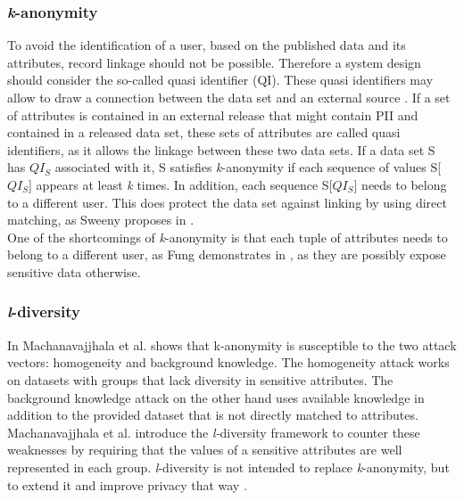        \subsubsection{\textit{k}-anonymity}
            \label{subsec:related:kanon}
            To avoid the identification of a user, based on the published data and its attributes, record linkage should not be possible. Therefore a system design should consider the so-called quasi identifier (QI). These quasi identifiers may allow to draw a connection between the data set and an external source \cite{sweeney_k-anonymity_2002}.
            If a set of attributes is contained in an external release that might contain PII and contained in a released data set, these sets of attributes are called quasi identifiers, as it allows the linkage between these two data sets.
            If a data set S has $QI_S$ associated with it, S satisfies \textit{k}-anonymity if each sequence of values S[$QI_S$] appears at least \textit{k} times. 
        	In addition, each sequence S[$QI_S$] needs to belong to a different user.
        	This does protect the data set against linking by using direct matching, as Sweeny proposes in  \cite{sweeney_k-anonymity_2002}.\\
            One of the shortcomings of \textit{k}-anonymity is that each tuple of attributes needs to belong to a different user, as Fung demonstrates in  \cite{fung_introduction_2011}, as they are possibly expose sensitive data otherwise.

        \subsubsection{\textit{l}-diversity}
            \label{subsec:related:l-div}
            In  \cite{machanavajjhala_l-diversity_2007} Machanavajjhala et al. shows that k-anonymity is susceptible to the two attack vectors: homogeneity and background knowledge.
            The homogeneity attack works on datasets with groups that lack diversity in sensitive attributes. The background knowledge attack on the other hand uses available knowledge in addition to the provided dataset that is not directly matched to attributes.\\
            Machanavajjhala et al. introduce the \textit{l-}diversity framework to counter these weaknesses by requiring that the values of a sensitive attributes are well represented in each group. \textit{l}-diversity is not intended to replace \textit{k}-anonymity, but to extend it and improve privacy that way  \cite{machanavajjhala_l-diversity_2007}.
            

